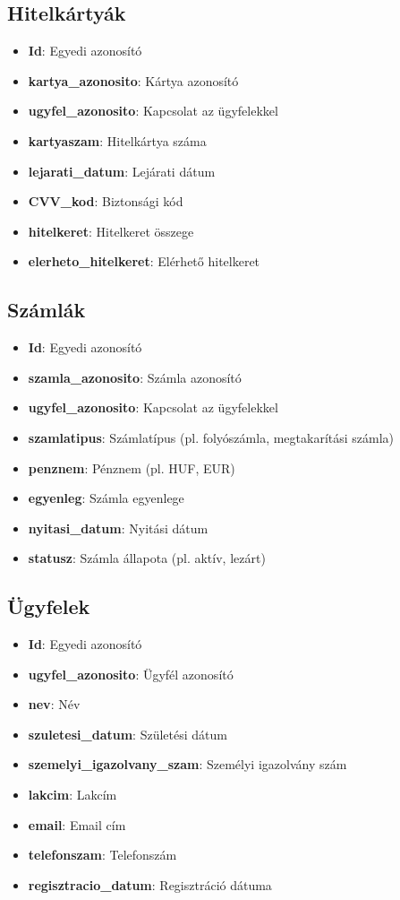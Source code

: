 \documentclass[colorlinks]{thesis-kando}
\theoremstyle{definition}
\theoremstyle{remark}
\begin{document}
\begin{itemize}
\subsection{Hitelkártyák}
\begin{itemize}
    \item \textbf{Id}: Egyedi azonosító
    \item \textbf{kartya\_azonosito}: Kártya azonosító
    \item \textbf{ugyfel\_azonosito}: Kapcsolat az ügyfelekkel
    \item \textbf{kartyaszam}: Hitelkártya száma
    \item \textbf{lejarati\_datum}: Lejárati dátum
    \item \textbf{CVV\_kod}: Biztonsági kód
    \item \textbf{hitelkeret}: Hitelkeret összege
    \item \textbf{elerheto\_hitelkeret}: Elérhető hitelkeret
\end{itemize}

\subsection{Számlák}
\begin{itemize}
    \item \textbf{Id}: Egyedi azonosító
    \item \textbf{szamla\_azonosito}: Számla azonosító
    \item \textbf{ugyfel\_azonosito}: Kapcsolat az ügyfelekkel
    \item \textbf{szamlatipus}: Számlatípus (pl. folyószámla, megtakarítási számla)
    \item \textbf{penznem}: Pénznem (pl. HUF, EUR)
    \item \textbf{egyenleg}: Számla egyenlege
    \item \textbf{nyitasi\_datum}: Nyitási dátum
    \item \textbf{statusz}: Számla állapota (pl. aktív, lezárt)
\end{itemize}

\subsection{Ügyfelek}
\begin{itemize}
    \item \textbf{Id}: Egyedi azonosító
    \item \textbf{ugyfel\_azonosito}: Ügyfél azonosító
    \item \textbf{nev}: Név
    \item \textbf{szuletesi\_datum}: Születési dátum
    \item \textbf{szemelyi\_igazolvany\_szam}: Személyi igazolvány szám
    \item \textbf{lakcim}: Lakcím
    \item \textbf{email}: Email cím
    \item \textbf{telefonszam}: Telefonszám
    \item \textbf{regisztracio\_datum}: Regisztráció dátuma
\end{itemize}


\end{itemize}
\end{document}
